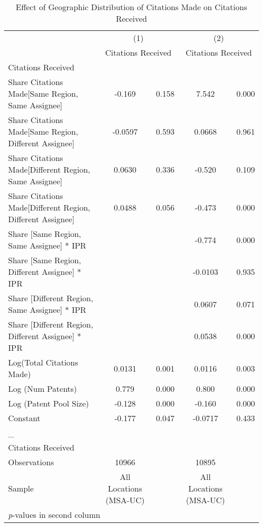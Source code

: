 {
\begin{longtable}{l*{2}{cc}}
\caption{Effect of Geographic Distribution of Citations Made on Citations Received \label{model13}}\\
\hline\hline\endfirsthead\hline\endhead\hline\endfoot\endlastfoot
                &\multicolumn{2}{c}{(1)}&\multicolumn{2}{c}{(2)}\\
                &\multicolumn{2}{c}{Citations Received}&\multicolumn{2}{c}{Citations Received}\\
\hline
Citations Received&         &         &         &         \\
Share Citations Made[Same Region, Same Assignee]&   -0.169&    0.158&    7.542&    0.000\\
Share Citations Made[Same Region, Different Assignee]&  -0.0597&    0.593&   0.0668&    0.961\\
Share Citations Made[Different Region, Same Assignee]&   0.0630&    0.336&   -0.520&    0.109\\
Share Citations Made[Different Region, Different Assignee]&   0.0488&    0.056&   -0.473&    0.000\\
Share [Same Region, Same Assignee] * IPR&         &         &   -0.774&    0.000\\
Share [Same Region, Different Assignee] * IPR&         &         &  -0.0103&    0.935\\
Share [Different Region, Same Assignee] * IPR&         &         &   0.0607&    0.071\\
Share [Different Region, Different Assignee] * IPR&         &         &   0.0538&    0.000\\
Log(Total Citations Made)&   0.0131&    0.001&   0.0116&    0.003\\
Log (Num Patents)&    0.779&    0.000&    0.800&    0.000\\
Log (Patent Pool Size)&   -0.128&    0.000&   -0.160&    0.000\\
Constant        &   -0.177&    0.047&  -0.0717&    0.433\\
\hline
\_               &         &         &         &         \\
Citations Received&         &         &         &         \\
\hline
Observations    &    10966&         &    10895&         \\
Sample          &All Locations (MSA-UC)&         &All Locations (MSA-UC)&         \\
\hline\hline
\multicolumn{5}{l}{\footnotesize \textit{p}-values in second column}\\
\end{longtable}
}
